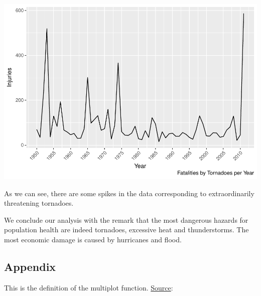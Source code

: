 \documentclass[]{article}
\begin{document}
\includegraphics{StormData_files/figure-latex/prepare_data_for_tornado_graph-1.pdf}

As we can see, there are some spikes in the data corresponding to
extraordinarily threatening tornadoes.

We conclude our analysis with the remark that the most dangerous hazards
for population health are indeed tornadoes, excessive heat and
thunderstorms. The most economic damage is caused by hurricanes and
flood.

\subsection{Appendix}\label{appendix}

This is the definition of the multiplot function.
\href{http://www.cookbook-r.com/Graphs/Multiple_graphs_on_one_page_(ggplot2)}{Source}:
\end{document}
